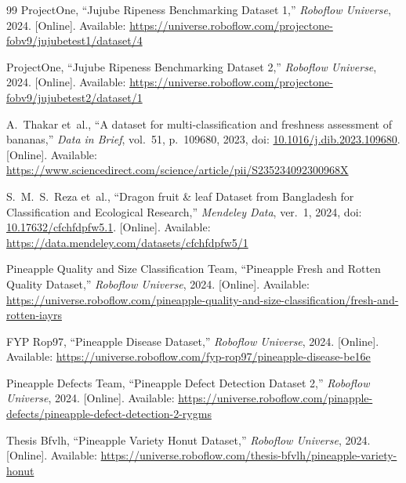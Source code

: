 \documentclass[11pt,a4paper]{article}
\begin{document}
\begin{thebibliography}{99}
ProjectOne, ``Jujube Ripeness Benchmarking Dataset 1,'' \emph{Roboflow Universe}, 2024. [Online]. Available: \url{https://universe.roboflow.com/projectone-fobv9/jujubetest1/dataset/4}

ProjectOne, ``Jujube Ripeness Benchmarking Dataset 2,'' \emph{Roboflow Universe}, 2024. [Online]. Available: \url{https://universe.roboflow.com/projectone-fobv9/jujubetest2/dataset/1}


A.~Thakar et~al., ``A dataset for multi-classification and freshness assessment of bananas,'' \emph{Data in Brief}, vol.~51, p.~109680, 2023, doi: \href{https://doi.org/10.1016/j.dib.2023.109680}{10.1016/j.dib.2023.109680}. [Online]. Available: \url{https://www.sciencedirect.com/science/article/pii/S235234092300968X}


S.~M.~S.~Reza et~al., ``Dragon fruit \& leaf Dataset from Bangladesh for Classification and Ecological Research,'' \emph{Mendeley Data}, ver.~1, 2024, doi: \href{https://doi.org/10.17632/cfchfdpfw5.1}{10.17632/cfchfdpfw5.1}. [Online]. Available: \url{https://data.mendeley.com/datasets/cfchfdpfw5/1}


Pineapple Quality and Size Classification Team, ``Pineapple Fresh and Rotten Quality Dataset,'' \emph{Roboflow Universe}, 2024. [Online]. Available: \url{https://universe.roboflow.com/pineapple-quality-and-size-classification/fresh-and-rotten-iayrs}

FYP Rop97, ``Pineapple Disease Dataset,'' \emph{Roboflow Universe}, 2024. [Online]. Available: \url{https://universe.roboflow.com/fyp-rop97/pineapple-disease-be16e}

Pineapple Defects Team, ``Pineapple Defect Detection Dataset 2,'' \emph{Roboflow Universe}, 2024. [Online]. Available: \url{https://universe.roboflow.com/pinapple-defects/pineapple-defect-detection-2-rygms}

Thesis Bfvlh, ``Pineapple Variety Honut Dataset,'' \emph{Roboflow Universe}, 2024. [Online]. Available: \url{https://universe.roboflow.com/thesis-bfvlh/pineapple-variety-honut}


\end{thebibliography}
\end{document}
